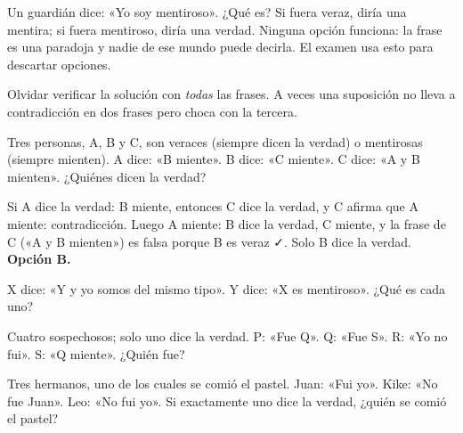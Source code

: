 \begin{ejemplo}[El guardián]
Un guardián dice: «Yo soy mentiroso». ¿Qué es?
\solucion Si fuera veraz, diría una mentira; si fuera mentiroso, diría una verdad. Ninguna opción funciona: la frase es una
paradoja y nadie de ese mundo puede decirla. El examen usa esto para descartar opciones.
\end{ejemplo}

\begin{trampa}
Olvidar verificar la solución con \emph{todas} las frases. A veces una suposición no lleva a contradicción en dos frases
pero choca con la tercera.
\end{trampa}

\begin{reto}
Tres personas, A, B y C, son veraces (siempre dicen la verdad) o mentirosas (siempre mienten). A dice: «B miente». B dice:
«C miente». C dice: «A y B mienten». ¿Quiénes dicen la verdad?
\end{reto}

\begin{retoresuelto}
Si A dice la verdad: B miente, entonces C dice la verdad, y C afirma que A miente: contradicción. Luego A miente: B dice la
verdad, C miente, y la frase de C («A y B mienten») es falsa porque B es veraz ✓. Solo B dice la verdad.
\textbf{Opción B.}
\end{retoresuelto}

\taller
{}
\begin{ejercicios}
\item X dice: «Y y yo somos del mismo tipo». Y dice: «X es mentiroso». ¿Qué es cada uno? 
\item Cuatro sospechosos; solo uno dice la verdad. P: «Fue Q». Q: «Fue S». R: «Yo no fui». S: «Q miente». ¿Quién fue? 
\end{ejercicios}
\begin{ejercicios}
\item Tres hermanos, uno de los cuales se comió el pastel. Juan: «Fui yo». Kike: «No fue Juan». Leo: «No fui yo». Si exactamente uno dice la verdad, ¿quién se comió el pastel?
\end{ejercicios}

